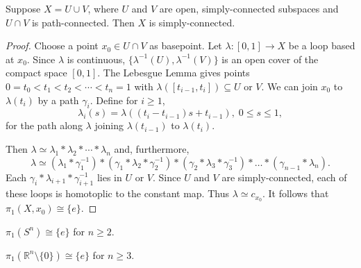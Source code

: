 \begin{theorem}
Suppose $X = U \cup V$, where $U$ and $V$ are open, simply-connected subspaces and $U \cap V$ is path-connected.
Then $X$ is simply-connected.
\end{theorem}

\begin{proof}
Choose a point $x_0 \in U \cap V$ as basepoint. Let $\lambda : [0,1] \rightarrow X$ be a loop based at $x_0$. Since $\lambda$
is continuous, $\{ \lambda^{-1}(U), \lambda^{-1}(V) \}$ is an open cover of the compact space $[0,1]$. The Lebesgue Lemma gives points
$0 = t_0 < t_1 < t_2 < \cdots < t_n = 1$ with $\lambda([t_{i-1},t_i]) \subseteq U$ or $V$. We can join $x_0$ to $\lambda(t_i)$ by a path $\gamma_i$.
Define for $i \geq 1$,
$$\lambda_i(s) = \lambda((t_i - t_{i-1})s + t_{i-1}), \; 0 \leq s \leq 1,$$
for the path along $\lambda$ joining $\lambda(t_{i-1})$ to $\lambda(t_i)$.

Then $\lambda \simeq \lambda_1 * \lambda_2 * \cdots * \lambda_n$ and, furthermore,
$$\lambda \simeq (\lambda_1 * \gamma_1^{-1}) * (\gamma_1 * \lambda_2 * \gamma_2^{-1}) * (\gamma_2 * \lambda_3 * \gamma_3^{-1}) * \dots * (\gamma_{n-1} * \lambda_n).$$
Each $\gamma_i * \lambda_{i+1} * \gamma_{i+1}^{-1}$ lies in $U$ or $V$. Since $U$ and $V$ are simply-connected, each of these loops is homotoplic to the constant map.
Thus $\lambda \simeq c_{x_0}$. It follows that $\pi_1(X,x_0) \cong \{ e \}$.
\end{proof}

\begin{corollary}
\label{nspheresimplyconnected}
$\pi_1(S^n) \cong \{ e \}$ for $n \geq 2$.
\end{corollary}

\begin{corollary}
$\pi_1(\mathbb{R}^n \setminus \{ 0 \}) \cong \{ e \}$ for $n \geq 3$.
\end{corollary}